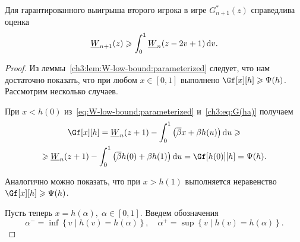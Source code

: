 {\begin{theorem}\label{ch3:thm:W-bound}
  Для гарантированного выигрыша второго игрока в игре $G_{n+1}^*(z)$ справедлива оценка
  \begin{equation*}
    \LW{n+1}(z) \geqslant \int_0^1 \LW{n}(z - 2v + 1) \di v.
  \end{equation*}
\end{theorem}
\begin{proof}
  Из леммы~\ref{ch3:lem:W-low-bound:parameterized} следует, что нам достаточно показать, что при любом $x \in [0, 1]$ выполнено $\Gf[x][h] \geqslant \Psi(h)$.
  Рассмотрим несколько случаев.

  При $x < h(0)$ из~\eqref{eq:W-low-bound:parameterized} и~\eqref{ch3:eq:G(ha)} получаем
  \begin{multline*}
    \Gf[x][h] =
    \LW{n}(z + 1) - \int_0^1 \left( \DCo x + \Co h(u) \right) \di u \geqslant \\
    \geqslant \LW{n}(z + 1) - \int_0^1 \left( \DCo h(0) + \Co h(1) \right) \di
    u = \Gf[h(0)][h] = \Psi(h).
  \end{multline*}

  Аналогично можно показать, что при $x > h(1)$ выполняется неравенство $\Gf[x][h] \geqslant \Psi(h)$.

  Пусть теперь $x = h(\alpha), \; \alpha \in [0, 1]$. Введем обозначения
  \[
    \alpha^- = \inf \left\{ v \;|\; h(v) = h(\alpha) \right\}, \quad \alpha^+ =
    \sup \left\{ v \;|\; h(v) = h(\alpha) \right\}.
  \]
  

\end{proof}}
